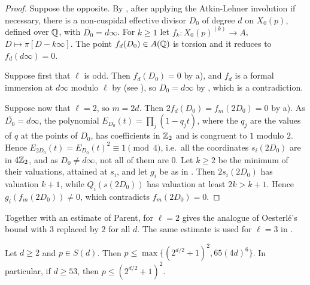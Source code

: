 \begin{proof}
Suppose the opposite. By , after applying the Atkin-Lehner involution if necessary, there is a non-cuspidal effective divisor $D_0$ of degree $d$ on $X_0(p)$, defined over $\mathbb{Q}$, with $\overline{D_0}=d\infty$. For $k\geq1$ let $f_k:X_0(p)^{(k)}\to A$, $D\mapsto\pi[D-k\infty]$. The point $f_d(D_0)\in A(\mathbb{Q})$ is torsion and it reduces to $f_d(d\infty)=0$.

Suppose first that $\ell$ is odd. Then $f_d(D_0)=0$ by  a), and $f_d$ is a formal immersion at $d\infty$ modulo $\ell$ by \cite[Theorem 4.18]{parentformal} (see \cite[Proposition 6.3]{DKSS}), so $D_0=d\infty$ by \cite[Lemma 4.2]{DKSS}, which is a contradiction.

Suppose now that $\ell=2$, so $m=2d$. Then $2f_d(D_0)=f_m(2D_0)=0$ by  a). As $\overline{D_0}=d\infty$, the polynomial $E_{D_0}(t)=\prod_j(1-q_jt)$, where the $q_j$ are the values of $q$ at the points of $D_0$, has coefficients in $\mathbb{Z}_2$ and is congruent to $1$ modulo $2$. Hence $E_{2D_0}(t)=E_{D_0}(t)^2\equiv1\pmod 4$, i.e.\ all the coordinates $s_i(2D_0)$ are in $4\mathbb{Z}_2$, and as $D_0\neq d\infty$, not all of them are $0$. Let $k\geq2$ be the minimum of their valuations, attained at $s_i$, and let $g_i$ be as in . Then $2s_i(2D_0)$ has valuation $k+1$, while $Q_i(s(2D_0))$ has valuation at least $2k>k+1$. Hence $g_i(f_m(2D_0))\neq0$, which contradicts $f_m(2D_0)=0$.
\end{proof}

Together with an estimate of Parent,  for $\ell=2$ gives the analogue of Oesterl\'e's bound with $3$ replaced by $2$ for all $d$. The same estimate is used for $\ell=3$ in \cite[Proposition 6.2]{DKSS}.

\begin{corollary}\label{cor:asymptotic}
Let $d\geq2$ and $p\in S(d)$. Then $p\leq\max\{(2^{d/2}+1)^2,65(4d)^6\}$. In particular, if $d\geq53$, then $p\leq(2^{d/2}+1)^2$.
\end{corollary}

